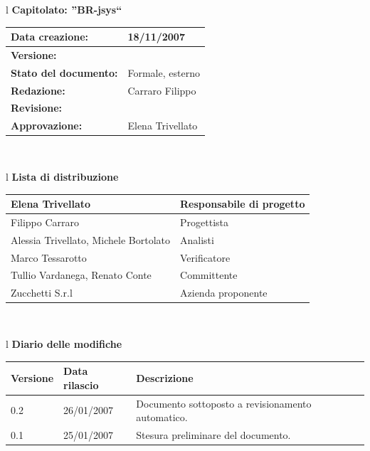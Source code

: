 \documentclass[11pt,titlepage,a4paper]{report}
\begin{document}
\begin{center}
\thispagestyle{plain}
\begin{table}[htbp]
\large{
\begin{tabular}{l}
\Large{\textbf{\textsf{Capitolato: ''BR-jsys``}}} \\
\begin{tabular}{||p{6cm}||p{6cm}||}
\hline
\textbf{Data creazione:} & 18/11/2007 \\ \hline
\textbf{Versione:} & \lv \\ \hline
\textbf{Stato del documento:} & Formale, esterno \\ \hline
\textbf{Redazione:} & Carraro Filippo \\ \hline
\textbf{Revisione:} &    \\ \hline
\textbf{Approvazione:}  & Elena Trivellato \\ \hline
\end{tabular} \\
\end{tabular}
}
\end{table}

\begin{table}[hbtp]
\large{
\begin{tabular}{l}
\Large{\textbf{\textsf{Lista di distribuzione}}} \\
\begin{tabular}{||p{6cm}||p{6cm}||} \hline
{Elena Trivellato}& Responsabile di progetto \\ \hline 
{Filippo Carraro}& Progettista \\ \hline
{Alessia Trivellato, Michele Bortolato}& Analisti \\ \hline
{Marco Tessarotto}& Verificatore \\ \hline
{Tullio Vardanega, Renato Conte}& Committente \\ \hline 
{Zucchetti S.r.l}& Azienda proponente\\ \hline
\end{tabular} \\
\end{tabular}
}
\end{table}
\begin{table}[hbtp]
\large{
\begin{tabular}{l}
\Large{\textbf{\textsf{Diario delle modifiche}}} \\
\begin{tabular}{||p{2cm}||p{3.5cm}||p{6cm}||} \hline
\textbf{Versione} & \textbf{Data rilascio} & \textbf{Descrizione} \\ \hline
0.2 & 26/01/2007 & Documento sottoposto a revisionamento automatico.\\ \hline
0.1 & 25/01/2007 & Stesura preliminare del documento. \\ \hline


\end{tabular}
\end{tabular}}
\end{table}
\end{center}
\end{document}
